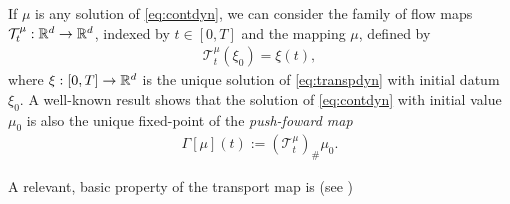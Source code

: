 If $\mu$ is any solution of \eqref{eq:contdyn}, we can consider  the family of flow maps $\mathcal{T}^{\mu}_t:\mathbb{R}^d \rightarrow\mathbb{R}^d$, indexed by $t \in [0,T]$ and the mapping $\mu$, defined by
\begin{align*}
\mathcal{T}^{\mu}_t(\xi_0) = \xi(t),
\end{align*}
where $\xi:[0,T]\rightarrow\mathbb{R}^d$ is the unique solution of \eqref{eq:transpdyn} with initial datum $\xi_0$. A well-known result \cite[Theorem 3.10]{CanCarRos10} shows that the solution of \eqref{eq:contdyn} with initial value $\mu_0$ is also the unique fixed-point of the \textit{push-foward map}
\begin{align}\label{eq:fixedpoint}
\Gamma[\mu](t) := (\mathcal{T}^{\mu}_t)_{\#}\mu_0.
\end{align}

A relevant, basic property of the transport map is (see \cite{CanCarRos10})

